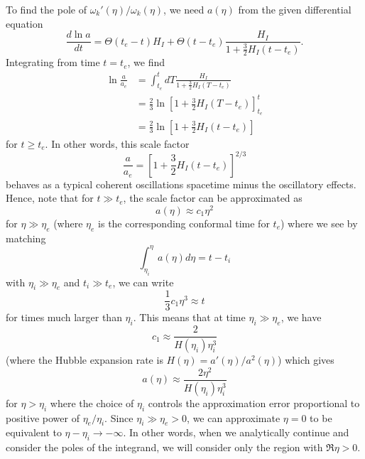 To find the pole of $\omega_{k}'(\eta)/\omega_{k}(\eta)$, we need
$a(\eta)$ from the given differential equation
\begin{equation}
\frac{d\ln a}{dt}=\Theta(t_{e}-t)H_{I}+\Theta(t-t_{e})\frac{H_{I}}{1+\frac{3}{2}H_{I}(t-t_{e})}.\label{eq:Hubble}
\end{equation}
Integrating from time $t=t_{e}$, we find
\begin{align}
\ln\frac{a}{a_{e}} & =\int_{t_{e}}^{t}dT\frac{H_{I}}{1+\frac{3}{2}H_{I}(T-t_{e})}\\
 & =\frac{2}{3}\ln\left[1+\frac{3}{2}H_{I}(T-t_{e})\right]_{t_{e}}^{t}\\
 & =\frac{2}{3}\ln\left[1+\frac{3}{2}H_{I}(t-t_{e})\right]
\end{align}
for $t\geq t_{e}$. In other words, this scale factor
\begin{equation}
\frac{a}{a_{e}}=\left[1+\frac{3}{2}H_{I}(t-t_{e})\right]^{2/3}\label{eq:aHeq}
\end{equation}
behaves as a typical coherent oscillations spacetime minus the oscillatory
effects. Hence, note that for $t\gg t_{e}$, the scale factor can
be approximated as 
\begin{equation}
a(\eta)\approx c_{1}\eta^{2}
\end{equation}
for $\eta\gg\eta_{e}$ (where $\eta_{e}$ is the corresponding conformal
time for $t_{e}$) where we see by matching 
\begin{equation}
\int_{\eta_{i}}^{\eta}a(\eta)d\eta=t-t_{i}
\end{equation}
with $\eta_{i}\gg\eta_{e}$ and $t_{i}\gg t_{e}$, we can write
\begin{equation}
\frac{1}{3}c_{1}\eta^{3}\approx t
\end{equation}
for times much larger than $\eta_{i}$. This means that at time $\eta_{i}\gg\eta_{e}$,
we have
\begin{equation}
c_{1}\approx\frac{2}{H(\eta_{i})\eta_{i}^{3}}
\end{equation}
(where the Hubble expansion rate is $H(\eta)=a'(\eta)/a^{2}(\eta)$)
which gives
\begin{equation}
a(\eta)\approx\frac{2\eta^{2}}{H(\eta_{i})\eta_{i}^{3}}
\end{equation}
for $\eta>\eta_{i}$ where the choice of $\eta_{i}$ controls the
approximation error proportional to positive power of $\eta_{e}/\eta_{i}$.
Since $\eta_{i}\gg\eta_{e}>0$, we can approximate $\eta=0$ to be
equivalent to $\eta-\eta_{i}\rightarrow-\infty$. In other words,
when we analytically continue and consider the poles of the integrand,
we will consider only the region with $\Re\eta>0$.


